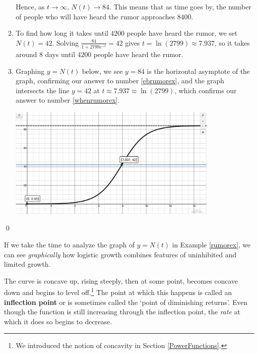 \begin{ex}
\begin{enumerate}
Hence, as $t \rightarrow \infty$, $N(t) \rightarrow 84$.   This means that as time goes by, the number of people who will have heard the rumor approaches $8400$. 

\item  To find how long it takes until $4200$ people have heard the rumor, we set $N(t) = 42$.  Solving $\frac{84}{1+2799e^{-t}} = 42$ gives $t =  \ln(2799) \approx 7.937$, so   it takes around $8$ days until $4200$ people have heard the rumor.

\item  Graphing $y=N(t)$ below, we see $y=84$ is the horizontal asymptote of the graph, confirming our answer to number  \ref{ebrumorex}, and the graph intersects the line $y=42$ at $t \approx 7.937 \approx \ln(2799) $, which confirms our answer to number \ref{whenrumorex}.

\begin{center}

\includegraphics[width=4in]{./ApplicationsofExponentialandLogarithmicFunctionsGraphics/ExpLogAppEx01.jpg} 


\end{center}

\end{enumerate}

\qed

\end{ex}

If we take the time to analyze the graph of $y=N(t)$ in Example \ref{rumorex}, we can see \textit{graphically} how logistic growth combines  features of uninhibited and limited growth.  

\smallskip

The curve is concave up, rising steeply, then at some point, becomes concave down and begins to level off.\footnote{We introduced the notion of concavity in Section \ref{PowerFunctions}.}  The point at which this happens is called an  \textbf{inflection point} or is sometimes called the `point of diminishing returns'.   Even though the function is still increasing through the inflection point, the \textit{rate} at which it does so begins to decrease. 

